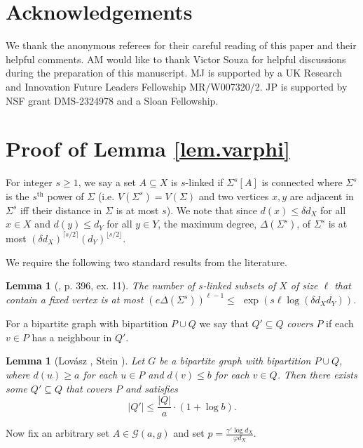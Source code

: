 \documentclass[10pt,a4paper]{amsart}
\newtheorem{lem}[thm]{Lemma}
\theoremstyle{definition}
\newcommand{\gd}[0]{\delta }
\newcommand{\sub}[0]{\subseteq}
\newcommand{\0}[0]{\emptyset}
\begin{document}
\section*{Acknowledgements}
We thank the anonymous referees for their careful reading of this paper and their helpful comments. AM would like to thank Victor Souza for helpful discussions during the preparation of this manuscript.  MJ is supported by a UK Research and Innovation Future Leaders Fellowship MR/W007320/2. JP is supported by NSF grant DMS-2324978 and a Sloan Fellowship.




\appendix
\section{Proof of Lemma \ref{lem.varphi}}\label{app:varphi}

For integer $s\geq 1$, we say a set $A\subseteq X$ is $s$-linked if $\Sigma^s[A]$ is connected where $\Sigma^s$ is the $s^{\text{th}}$ power of $\Sigma$ (i.e. $V(\Sigma^s)=V(\Sigma)$ and two vertices $x,y$ are adjacent in $\Sigma^s$ iff their distance in $\Sigma$ is at most $s$). We note that since $d(x)\leq \delta d_X$ for all $x\in X$ and $d(y)\leq d_Y$ for all $y\in Y$, the maximum degree, $\Delta(\Sigma^s)$, of $\Sigma^s$ is at most $(\gd d_X)^{\lceil s/2 \rceil}(d_Y)^{\lfloor s/2 \rfloor}$.

We require the following two standard results from the literature.

\begin{lem}[\cite{knuth}, p. 396, ex. 11]\label{linked}
    The number of $s$-linked subsets of $X$ of size $\ell$ that contain a fixed vertex is at most $(e \Delta(\Sigma^s))^{\ell-1} \le $ $\exp(s\ell\log(\delta d_Xd_Y))$.
\end{lem}

For a bipartite graph with bipartition $P \cup Q$ we say that $Q'\sub Q$ \emph{covers} $P$ if each $v\in P$ has a neighbour in $Q'$.

\begin{lem}[Lov\'asz \cite{Lov75}, Stein \cite{Ste74}]\label{lem.LS} Let $G$ be a bipartite graph with bipartition $P \cup Q$, where $d(u)\ge a$ for each $u \in P$ and $d(v)\le b$ for each $v \in Q$. Then there exists some $Q' \sub Q$ that covers $P$ and satisfies
\[|Q'|\le\frac{|Q|}{a}\cdot(1+\log b).\]
\end{lem}

Now fix an arbitrary set $A\in \mathcal{G}(a,g)$ and set $p=\frac{\gamma'\log d_X}{\varphi d_X}$.
\end{document}
